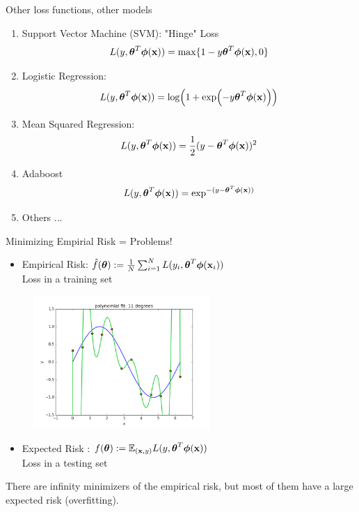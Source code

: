 \documentclass[xcolor=pdftex,dvipsnames,table,mathserif]{beamer}
\begin{document}
\begin{frame}{Other loss functions, other models}
\begin{enumerate}
\item Support Vector Machine (SVM): "Hinge" Loss 
\begin{equation}
L(y,\boldsymbol{\theta}^T\boldsymbol{\phi}(\mathbf{x}))=\max \{1-y\boldsymbol{\theta}^T\boldsymbol{\phi}(\mathbf{x}),0\}
\end{equation}
\item Logistic Regression: 
\begin{equation}
L(y,\boldsymbol{\theta}^T\boldsymbol{\phi}(\mathbf{x}))=\log (1+\exp (-y\boldsymbol{\theta}^T\boldsymbol{\phi}(\mathbf{x})))
\end{equation}
\item Mean Squared Regression:
\begin{equation}
L(y,\boldsymbol{\theta}^T\boldsymbol{\phi}(\mathbf{x}))=\frac{1}{2}(y-\boldsymbol{\theta}^T\boldsymbol{\phi}(\mathbf{x}))^2
\end{equation}
\item Adaboost
\begin{equation}
L(y,\boldsymbol{\theta}^T\boldsymbol{\phi}(\mathbf{x}))=\exp^{ -(y-\boldsymbol{\theta}^T\boldsymbol{\phi}(\mathbf{x}))}
\end{equation}
\item Others ...
\end{enumerate}
\end{frame}

\begin{frame}{Minimizing Empirial Risk = Problems!}
\begin{itemize}
\item Empirical Risk: $\hat{f}(\boldsymbol{\theta}) :=\frac{1}{N} \sum_{i=1}^{N} L(y_i,\boldsymbol{\theta}^T\boldsymbol{\phi} (\mathbf{x}_i))$ \pause \\\alert{Loss in a training set}
\end{itemize}
\begin{figure}[htb]
\includegraphics[width=0.6\textwidth]{../graphics/polyfit_degree_11.png}
\end{figure}
 \pause
\begin{itemize}
\item Expected Risk : $f(\boldsymbol{\theta}) := \mathbb{E}_{(\mathbf{x},y)} L(y,\boldsymbol{\theta}^T\boldsymbol{\phi} (\mathbf{x}))$ \pause  \\\alert{Loss in a testing set}
\end{itemize}
There are infinity minimizers of the empirical risk, but most of them have a large expected risk (\alert{overfitting}).
\end{frame}
\end{document}
